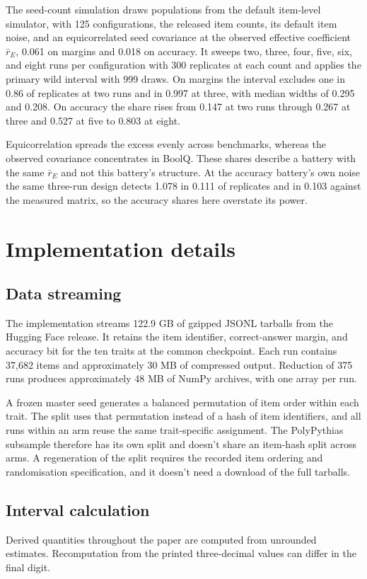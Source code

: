 The seed-count simulation draws populations from the default item-level simulator, with 125 configurations, the released item counts, its default item noise, and an equicorrelated seed covariance at the observed effective coefficient $\bar r_E$, 0.061 on margins and 0.018 on accuracy. It sweeps two, three, four, five, six, and eight runs per configuration with 300 replicates at each count and applies the primary wild interval with 999 draws. On margins the interval excludes one in 0.86 of replicates at two runs and in 0.997 at three, with median widths of 0.295 and 0.208. On accuracy the share rises from 0.147 at two runs through 0.267 at three and 0.527 at five to 0.803 at eight.

Equicorrelation spreads the excess evenly across benchmarks, whereas the observed covariance concentrates in BoolQ. These shares describe a battery with the same $\bar r_E$ and not this battery's structure. At the accuracy battery's own noise the same three-run design detects 1.078 in 0.111 of replicates and in 0.103 against the measured matrix, so the accuracy shares here overstate its power.

\section{Implementation details}
\label{app:implementation}

\subsection{Data streaming}
The implementation streams 122.9 GB of gzipped JSONL tarballs from the Hugging Face release. It retains the item identifier, correct-answer margin, and accuracy bit for the ten traits at the common checkpoint. Each run contains 37,682 items and approximately 30 MB of compressed output. Reduction of 375 runs produces approximately 48 MB of NumPy archives, with one array per run.

A frozen master seed generates a balanced permutation of item order within each trait. The split uses that permutation instead of a hash of item identifiers, and all runs within an arm reuse the same trait-specific assignment. The PolyPythias subsample therefore has its own split and doesn't share an item-hash split across arms. A regeneration of the split requires the recorded item ordering and randomisation specification, and it doesn't need a download of the full tarballs.

\subsection{Interval calculation}
Derived quantities throughout the paper are computed from unrounded estimates. Recomputation from the printed three-decimal values can differ in the final digit.

